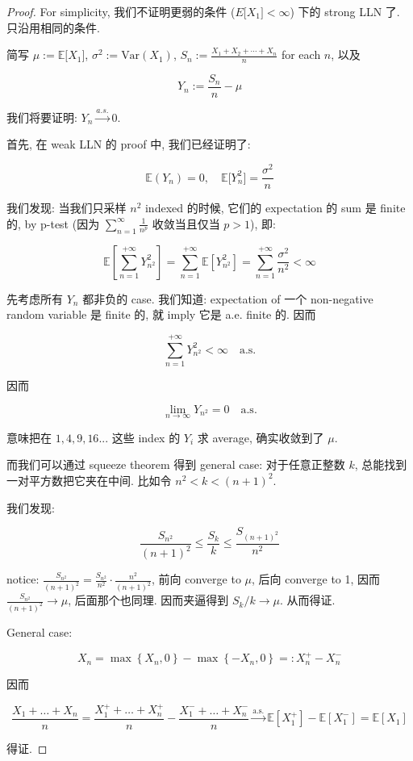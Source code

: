 \documentclass{qlnotes-export}
\begin{document}
\begin{proof}

For simplicity, 我们不证明更弱的条件 (\(E\lbrack X_{1}\rbrack < \infty\)) 下的 strong LLN 了. 只沿用相同的条件.

简写 \(\mu := {\mathbb{E}}\lbrack X_{1}\rbrack\), \(\sigma^{2} := \text{Var}(X_{1})\), \(S_{n} := \frac{X_{1} + X_{2} + \cdots + X_{n}}{n}\) for each \(n\), 以及

\[Y_{n} := \frac{S_{n}}{n} - \mu\]

我们将要证明: \(Y_{n}\overset{a.s.}{\rightarrow}0\).

首先, 在 weak LLN 的 proof 中, 我们已经证明了:

\[{\mathbb{E}}(Y_{n}) = 0,\quad{\mathbb{E}}\lbrack Y_{n}^{2}\rbrack = \frac{\sigma^{2}}{n}\]

我们发现: 当我们只采样 \(n^{2}\) indexed 的时候, 它们的 expectation 的 sum 是 finite 的, by p-test (因为 \(\sum_{n = 1}^{\infty}\frac{1}{n^{p}}\) 收敛当且仅当 \(p > 1\)), 即:

\[{\mathbb{E}}\left\lbrack {\sum\limits_{n = 1}^{+ \infty}Y_{n^{2}}^{2}} \right\rbrack = \sum\limits_{n = 1}^{+ \infty}{\mathbb{E}}\left\lbrack Y_{n^{2}}^{2} \right\rbrack = \sum\limits_{n = 1}^{+ \infty}\frac{\sigma^{2}}{n^{2}} < \infty\]

先考虑所有 \(Y_{n}\) 都非负的 case. 我们知道: expectation of 一个 non-negative random variable 是 finite 的, 就 imply 它是 a.e. finite 的. 因而

\[\sum\limits_{n = 1}^{+ \infty}Y_{n^{2}}^{2} < \infty\quad\text{a.s.}\]

因而

\[\lim\limits_{n\rightarrow\infty}Y_{n^{2}} = 0\quad\text{a.s.}\]

意味把在 \(1,4,9,16...\) 这些 index 的 \(Y_{i}\) 求 average, 确实收敛到了 \(\mu\).

而我们可以通过 squeeze theorem 得到 general case: 对于任意正整数 \(k\), 总能找到一对平方数把它夹在中间. 比如令 \(n^{2} < k < (n + 1)^{2}\).

我们发现:

\[\frac{S_{n^{2}}}{(n + 1)^{2}} \leq \frac{S_{k}}{k} \leq \frac{S_{(n + 1)^{2}}}{n^{2}}\]

notice: \(\frac{S_{n^{2}}}{(n + 1)^{2}} = \frac{S_{n^{2}}}{n^{2}} \cdot \frac{n^{2}}{(n + 1)^{2}}\), 前向 converge to \(\mu\), 后向 converge to 1, 因而 \(\frac{S_{n^{2}}}{(n + 1)^{2}}\rightarrow\mu\), 后面那个也同理. 因而夹逼得到 \(S_{k}/k\rightarrow\mu\). 从而得证.

General case:

\[X_{n} = \max\left\{ {X_{n},0} \right\} - \max\left\{ {- X_{n},0} \right\} = :X_{n}^{+} - X_{n}^{-}\]

因而

\[\frac{X_{1} + \ldots + X_{n}}{n} = \frac{X_{1}^{+} + \ldots + X_{n}^{+}}{n} - \frac{X_{1}^{-} + \ldots + X_{n}^{-}}{n}\overset{\text{a.s.}}{\rightarrow}{\mathbb{E}}\left\lbrack X_{1}^{+} \right\rbrack - {\mathbb{E}}\left\lbrack X_{1}^{-} \right\rbrack = {\mathbb{E}}\left\lbrack X_{1} \right\rbrack\]

得证.

\end{proof}
\end{document}
